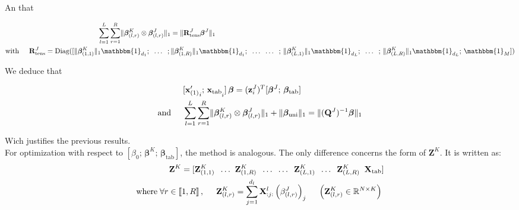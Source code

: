 \documentclass[10pt]{article}
\begin{document}
An that

\begin{align}
    \sum\limits_{l = 1}^L \sum\limits_{r = 1}^R \lVert \bm{\beta}_{(l,r)}^K \otimes \bm{\beta}_{(l,r)}^J \rVert_1                                            & = \lVert \mathbf{R}_{\text{tens}}^J \bm{\beta}^J\rVert_1                                                                                                                                                                                                  \\
    \text{with} \hspace{0.5 cm} \mathbf{R}_{\text{tens}}^J = \text{Diag}    ([\lVert \bm{\beta}_{(1,1)}^K \rVert_1 \mathbbm{1}_{d_1}; \; \; \hdots \; \;; \, & \lVert \bm{\beta}_{(1,R)}^K \rVert_1 \mathbbm{1}_{d_1};  \; \; \hdots \; \;  \hdots \; \; ;\, \lVert \bm{\beta}_{(L,1)}^K \rVert_1 \mathbbm{1}_{d_L};  \; \;  \hdots \; \; ;\, \lVert \bm{\beta}_{(L,R)}^K \rVert_1 \mathbbm{1}_{d_L}; \, \mathbbm{1}_M])
\end{align}

\noindent We deduce that

\begin{align}
                               & [{\mathbf{x}_{\text{(1)}}'}_i; \, \mathbf{x}_{\text{tab}\raisebox{-4pt}{$\scriptstyle i$}}]\, \bm{\beta}= (\mathbf{z}_i^J)^T [\bm{\beta}^J; \, \bm{\beta}_{\text{tab}}]                                 \\
    \text{and} \hspace{0.5 cm} & \sum\limits_{l = 1}^L \sum\limits_{r = 1}^R \lVert \bm{\beta}_{(l,r)}^K \otimes \bm{\beta}_{(l,r)}^J \rVert_1 + \lVert \bm{\beta}_{\text{uni}} \rVert_1= \lVert (\mathbf{Q}^J)^{-1} \bm{\beta} \rVert_1
\end{align}

\noindent Wich justifies the previous results.\\[5 pt]
\noindent For optimization with respect to $\left[ \beta_0 ;\, \bm{\beta}^K ;\,  \bm{\beta}_{\text{tab}} \right]$, the method is analogous. The only difference concerns the form of $\mathbf{Z}^K$. It is written as:
\begin{align}
    \mathbf{Z}^K	=[ \mathbf{Z}_{(1,1)}^K \; \; \hdots \; \;                                          & \mathbf{Z}_{(1,R)}^K  \; \; \hdots  \; \; \hdots \; \; \mathbf{Z}_{(L,1)}^K \; \; \hdots \; \; \mathbf{Z}_{(L,R)}^K \; \; \mathbf{X}_{\text{tab}}] \label{eqref: Z^K}               \\
    \text{where} \; \forall r \in \llbracket 1, R\rrbracket\, , \hspace{0.5 cm} \mathbf{Z}_{(l,r)}^K & = \sum\limits_{j = 1}^{d_l} \mathbf{X}_{:j:}^l \left(\beta_{(l,r)}^J\right)_j \hspace{0.5 cm} \left(\mathbf{Z}_{(l,r)}^K \in \mathbb{R}^{N \times K}\right) \label{eqref: Z_tens^K}
\end{align}
\end{document}
